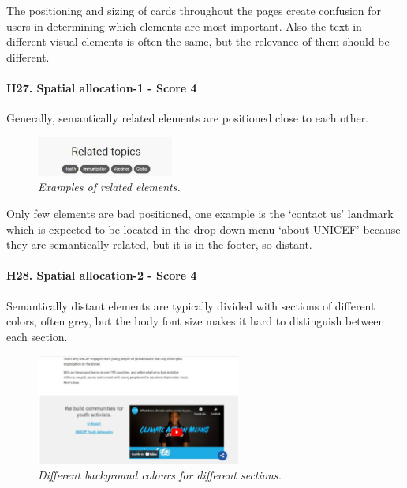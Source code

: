 \newline The positioning and sizing of cards throughout the pages create confusion for users in determining which elements are most important.
\newline Also the text in different visual elements is often the same, but the relevance of them should be different.
\newline
\newline \paragraph{H27. Spatial allocation-1 - Score 4} \label{subsec:H27}	Generally, semantically related elements are positioned close to each other.
\begin{figure}[!h]
	\begin{center}
		\includegraphics[width=0.4\textwidth]{FinalScores30.jpg}
		\captionsetup{font=small}
		\caption{\textit{Examples of related elements.}}
	\end{center}
\end{figure}
\newline Only few elements are bad positioned, one example is the ‘contact us’ landmark which is expected to be located in the drop-down menu ‘about UNICEF’ because they are semantically related, but it is in the footer, so distant.
\newline
\newline \paragraph{H28. Spatial allocation-2 - Score 4} \label{subsec:H28}	Semantically distant elements are typically divided with sections of different colors, often grey, but the body font size makes it hard to distinguish between each section. 
\begin{figure}[!h]
	\begin{center}
		\includegraphics[width=0.6\textwidth]{FinalScores31.jpg}
		\captionsetup{font=small}
		\caption{\textit{Different background colours for different sections.}}
	\end{center}
\end{figure}
